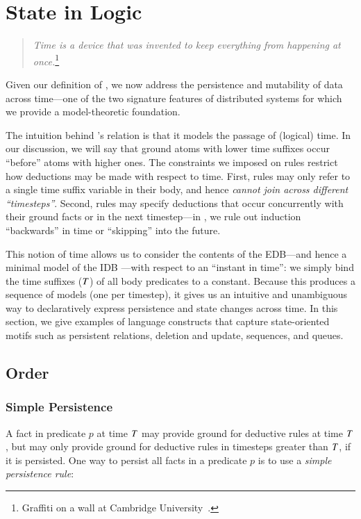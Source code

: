 \section{State in Logic}
\label{sec:stateupdate}


\begin{quote}
%
\emph{Time is a device that was invented to keep everything from
happening at once.}\footnote{Graffiti on a wall at Cambridge
University~\cite{scheme}.}
%
\end{quote} 

Given our definition of \lang, we now address the persistence and mutability
of data across time---one of the two signature features of distributed systems
for which we provide a model-theoretic foundation. 

The intuition behind \lang's  relation is that it models the
passage of (logical) time.  In our discussion, we will say that ground atoms
with lower time suffixes occur ``before'' atoms with higher ones.
The constraints we imposed on \lang rules restrict how deductions may be made
with respect to time.  First, rules may only refer to a single time suffix variable in
their body, and hence {\em cannot join across different ``timesteps''}.  Second, rules may specify
deductions that occur concurrently with their ground facts or in the next
timestep---in \lang, we rule out induction ``backwards'' in time or
``skipping'' into the future. 

This notion of time allows us to consider the contents of the EDB---and hence
a minimal model of the IDB ---with respect to an ``instant in time'': we simply
bind the time suffixes ($\DT$) of all body predicates to a constant.  Because
this produces a sequence of models (one per timestep), it gives us an intuitive
and unambiguous way to declaratively express persistence and state changes
across time.  In this section, we give examples of language constructs
that capture state-oriented motifs such as persistent relations,
deletion and update, sequences, and queues.

\subsection{Order}

\subsubsection{Simple Persistence}
A fact in predicate $p$ at time $\DT$ may provide ground for deductive rules
at time $\DT$, but may only provide ground for deductive rules in timesteps greater than $\DT$,
if it is persisted.  One way to persist all facts in a predicate $p$ is to use a {\em simple persistence rule}:

